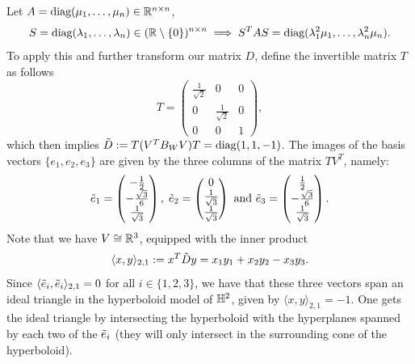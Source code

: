 Let \(A = \text{diag}(\mu_1,\ldots,\mu_n)\in\mathbb{R}^{n\times n}\),
\begin{equation*}
    S=\text{diag}(\lambda_1,\ldots, \lambda_n)\in(\mathbb{R}\setminus\{0\})^{n\times n} \implies S^TAS = \text{diag}(\lambda_1^2\mu_1,\ldots,\lambda_n^2\mu_n).
\end{equation*}
To apply this and further transform our matrix \(D\), define the invertible matrix \(T\) as follows
\[T = \begin{pmatrix} \frac{1}{\sqrt{2}} & 0 & 0 \\ 0 & \frac{1}{\sqrt{2}} & 0 \\ 0 & 0 & 1 \end{pmatrix},\]
which then implies \(\Tilde{D} := T(V^T B_W V)T = \text{diag}(1,1,-1)\).
The images of the basis vectors \(\{e_1,e_2,e_3\}\) are given by the three columns of the matrix \(TV^T\), namely:
\begin{equation*}
    \Tilde{e}_1 = \begin{pmatrix} -\frac{1}{2} \\ - \frac{\sqrt{3}}{6} \\ \frac{1}{\sqrt{3}} \end{pmatrix},\;
    \Tilde{e}_2 = \begin{pmatrix} 0 \\ \frac{1}{\sqrt{3}} \\ \frac{1}{\sqrt{3}} \end{pmatrix} \text{ and }
    \Tilde{e}_3 = \begin{pmatrix} \frac{1}{2} \\ -\frac{\sqrt{3}}{6} \\ \frac{1}{\sqrt{3}} \end{pmatrix}.
\end{equation*}
Note that we have \(V\cong \mathbb{R}^3\), equipped with the inner product
\[\langle x, y \rangle_{2,1} := x^T\Tilde{D}y = x_1y_1 + x_2y_2 - x_3y_3.\]
Since \(\langle \Tilde{e}_i, \Tilde{e}_i \rangle_{2,1} = 0\) for all \(i\in \{1,2,3\}\), we have that these three vectors span an ideal triangle in the hyperboloid model of \(\mathbb{H}^2\), given by \(\langle x, y \rangle_{2,1} = -1\).
One gets the ideal triangle by intersecting the hyperboloid with the hyperplanes spanned by each two of the \(\Tilde{e}_i\) (they will only intersect in the surrounding cone of the hyperboloid).

